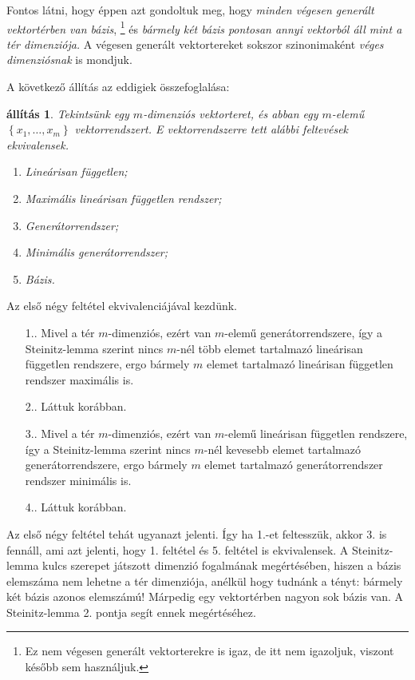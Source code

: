 \documentclass[9pt, a4paper, showtrims]{memoir}
\makeatletter
\renewenvironment{proof}[1][\proofname]
    {\par\pushQED{\qed}%
    \normalfont \topsep6\p@\@plus6\p@\relax
    \trivlist
    \item[\hskip\labelsep
        \itshape
    #1\@addpunct{:}]\ignorespaces}
    {\popQED\endtrivlist\@endpefalse}
\theoremstyle{plain}
\newtheorem{proposition}{állítás}[chapter]
\theoremstyle{remark}
\theoremstyle{definition}
\makeatother
\begin{document}
Fontos látni, hogy éppen azt gondoltuk meg, hogy \emph{minden végesen generált vektortérben van bázis},
\footnote{Ez nem végesen generált vektorterekre is igaz, de itt nem igazoljuk,
	viszont később sem használjuk.}
és \emph{bármely két bázis pontosan annyi vektorból áll mint a tér dimenziója.}
A végesen generált vektortereket sokszor szinonimaként \emph{véges dimenziósnak} is mondjuk.

A következő állítás az eddigiek összefoglalása:
\begin{proposition}
	Tekintsünk egy $m$-dimenziós vektorteret, és abban egy $m$-elemű
	$\left\{ x_1,\ldots,x_m \right\}$
	vektorrendszert.
	E vektorrendszerre tett alábbi feltevések ekvivalensek.
	\begin{enumerate}
		\item Lineárisan független;
		\item Maximális lineárisan független rendszer;
		\item Generátorrendszer;
		\item Minimális generátorrendszer;
		\item Bázis.\qedhere
	\end{enumerate}
\end{proposition}
\begin{proof}
	Az első négy feltétel ekvivalenciájával kezdünk.
	\begin{itemize}
		\item[1.\Rightarrow 2.]
		      Mivel a tér $m$-dimenziós, ezért van $m$-elemű generátorrendszere,
		      így a Steinitz-lemma szerint nincs $m$-nél több elemet tartalmazó lineárisan független
		      rendszere, ergo bármely $m$ elemet tartalmazó lineárisan független rendszer maximális is.
		\item[2.\Rightarrow 3.]
		      Láttuk korábban.
		\item[3.\Rightarrow 4.]
		      Mivel a tér $m$-dimenziós, ezért van $m$-elemű lineárisan független rendszere,
		      így a Steinitz-lemma szerint nincs $m$-nél kevesebb elemet tartalmazó generátorrendszere,
		      ergo bármely $m$ elemet tartalmazó generátorrendszer rendszer minimális is.
		\item[4.\Rightarrow 1.]
		      Láttuk korábban.
	\end{itemize}

	Az első négy feltétel tehát ugyanazt jelenti.
	Így ha 1.-et feltesszük, akkor 3. is fennáll, ami azt jelenti, hogy 1. feltétel és 5. feltétel is ekvivalensek.
\end{proof}
A Steinitz-lemma kulcs szerepet játszott dimenzió fogalmának megértésében,
hiszen a bázis elemszáma nem lehetne a tér dimenziója, anélkül hogy tudnánk a tényt:
bármely két bázis azonos elemszámú!
Márpedig egy vektortérben nagyon sok bázis van.
A Steinitz-lemma 2. pontja segít ennek megértéséhez.
\end{document}
